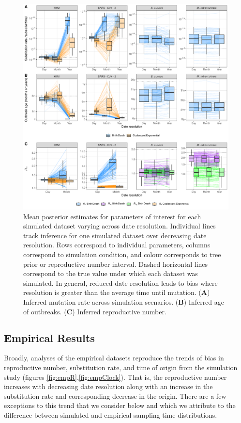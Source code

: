 \documentclass{article}
\begin{document}
\begin{spacing}{1.5}
\begin{figure}
    \centering
    \includegraphics[width=\textwidth]{simulation_parm_panel.pdf}
    \caption{Mean posterior estimates for parameters of interest for each simulated dataset varying across date resolution. Individual lines track inference for one simulated dataset over decreasing date resolution. Rows correspond to individual parameters, columns correspond to simulation condition, and colour corresponds to tree prior or reproductive number interval. Dashed horizontal lines correspond to the true value under which each dataset was simulated. In general, reduced date resolution leads to bias where resolution is greater than the average time until mutation.  (\textbf{A}) Inferred mutation rate across simulation scenarios. (\textbf{B}) Inferred age of outbreaks. (\textbf{C}) Inferred reproductive number. }
    \label{fig:sim-parms}
\end{figure}

\subsection*{Empirical Results}

Broadly, analyses of the empirical datasets reproduce the trends of bias in reproductive number, substitution rate, and time of origin from the simulation study (figures \ref{fig:empR},\ref{fig:empClock}). That is, the reproductive number increases with decreasing date resolution along with an increase in the substitution rate and corresponding decrease in the origin. There are a few exceptions to this trend that we consider below and which we attribute to the difference between simulated and empirical sampling time distributions.


\end{spacing}
\end{document}
